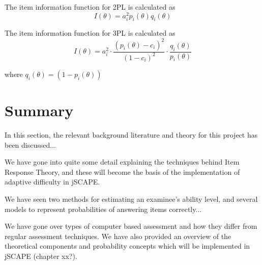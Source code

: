 The item information function for 2PL is calculated as
$$I(\theta) = a_i^2 p_i(\theta)q_i(\theta)$$

The item information function for 3PL is calculated as
$$I(\theta) = a_i^2 \cdot \dfrac{(p_i(\theta)-c_i)^2}{(1-c_i)^2} \cdot \dfrac{q_i(\theta)}{p_i(\theta)}$$

where $q_i(\theta) = (1-p_i(\theta))$


\section{Summary}
In this section, the relevant background literature and theory for this project has been discussed...\newline

We have gone into quite some detail explaining the techniques behind Item Response Theory, and these will become the basis of the implementation of adaptive difficulty in jSCAPE.\newline

We have seen two methods for estimating an examinee's ability level, and several models to represent probabilities of answering items correctly...\newline

We have gone over types of computer based assessment and how they differ from regular assessment techniques. We have also provided an overview of the theoretical components and probability concepts which will be implemented in jSCAPE (chapter xx?).
